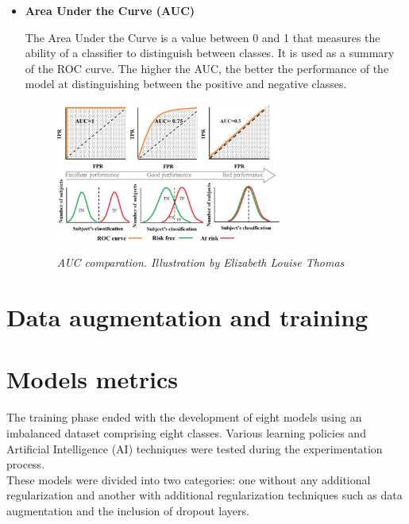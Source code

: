 \begin{itemize}
  \item {\bf Area Under the Curve (AUC)}

  The Area Under the Curve is a value between 0 and 1 that measures the
  ability of a classifier to distinguish between classes. It is used as a summary of
  the ROC curve. The higher the AUC, the better the performance of the model at
  distinguishing between the positive and negative classes.

  \begin{figure}[H]
    \centering
    \includegraphics[width=0.7\textwidth]{imatges/validation-strategy/auc.png}
    \caption[AUC-ROC performance]{\textit{AUC comparation. Illustration by Elizabeth Louise Thomas}}
    {\label{fig:auc-roc}}
  \end{figure}

\end{itemize}

\newpage

\section{Data augmentation and training}

\section{Models metrics}

The training phase ended with the development of eight models using an
imbalanced dataset comprising eight classes. Various learning policies and
Artificial Intelligence (AI) techniques were tested during the experimentation
process.  \\

These models were divided into two categories: one without any
additional regularization and another with additional regularization techniques
such as data augmentation and the inclusion of dropout layers.

